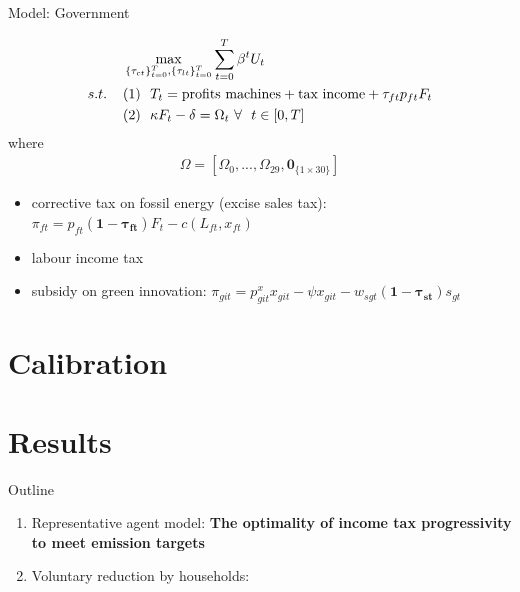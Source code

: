 \documentclass[11pt,aspectratio=169]{beamer}
\begin{document}
\begin{frame}{Model: Government}

\begin{align*}
&\max_{\{\tau_{ct}\}_{t=0}^{T}, \{\tau_{lt}\}_{t=0}^{T}} \sum_{t=0}^{T}\beta^t U_{t}\\
s.t. \hspace{4mm}
&(1)\ \ T_t= \text{profits machines}+\text{tax income}+\tau_{ft}p_{ft}F_{t}\\
&
(2)\ \ \kappa F_t-\delta =\Omega_t\  \forall\ \  t\in[0,T]
\end{align*}
where 
\begin{align*}
\Omega =\left[\Omega_0,..., \Omega_{29}, \pmb{0}_{\{1\times 30\}}\right]
\end{align*}
	\begin{itemize}
	\item corrective tax on fossil energy (excise sales tax): $\pi_{ft}=p_{ft}\pmb{(1-\tau_{ft})}F_t-c(L_{ft}, x_{ft})$
	\item labour income tax
	\item subsidy on green innovation: $\pi_{git}=p_{git}^x x_{git}-\psi x_{git}-w_{sgt}\pmb{(1-\tau_{st})}s_{gt}$
\end{itemize}
\end{frame}

\section{Calibration}


\section{Results}

\begin{frame}{Outline}
\begin{enumerate}
	\item Representative agent model: \textbf{The optimality of income tax progressivity to meet emission targets}
	\item Voluntary reduction by households: \textbf{}
\end{enumerate}
\end{frame}
\end{document}
